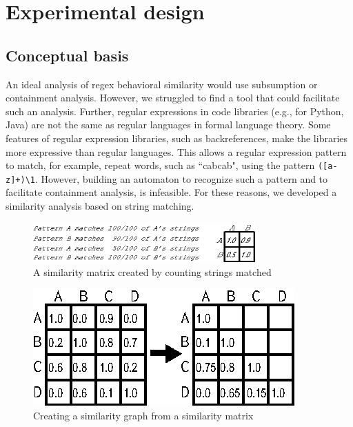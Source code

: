 \section{Experimental design}

\subsection{Conceptual basis}

An ideal analysis of regex behavioral similarity would use subsumption or containment analysis. However, we struggled to find a tool that could facilitate such an analysis. Further, regular expressions in code libraries (e.g., for Python, Java) are not the same as regular languages in formal language theory. Some features of regular expression libraries, such as backreferences, make the libraries more expressive than regular languages. This allows a regular expression pattern to match, for example, repeat words, such as ``cabcab", using the pattern {\tt ([a-z]+)\verb!\!1}. However, building an automaton to recognize such a pattern and to facilitate containment analysis, is infeasible.
For these reasons, we developed a similarity analysis based on string matching.

\begin{figure}[tb]
\centering
\includegraphics[height=0.6in]{nontex/illustrations/minimalMatrix.eps}
\caption{A similarity matrix created by counting strings matched}
\label{fig:minimalMatrix}
\end{figure}

\begin{figure}[tb]
\centering
\includegraphics[width=0.7\columnwidth]{nontex/illustrations/matrixToGraph.eps}
\vspace{-6pt}
\caption{Creating a similarity graph from a similarity matrix}
\vspace{-6pt}
\label{fig:matrixToGraph}
\end{figure}



